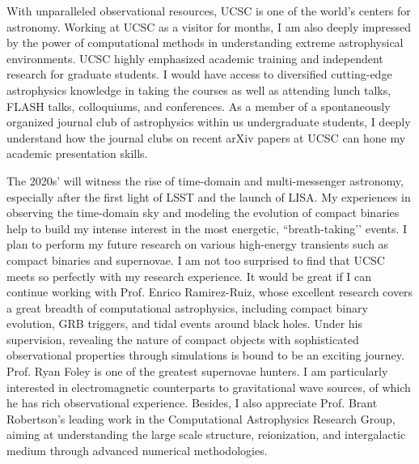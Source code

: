 \documentclass[11pt, a4paper]{awesome-cv} %
\begin{document}
\makecvheader %



\begin{cvletter}




With unparalleled observational resources, UCSC is one of the world’s centers for astronomy. Working at UCSC as a visitor for months, I am also deeply impressed by the power of computational methods in understanding extreme astrophysical environments. UCSC highly emphasized academic training and independent research for graduate students. I would have access to diversified cutting-edge astrophysics knowledge in taking the courses as well as attending lunch talks, FLASH talks, colloquiums, and conferences. As a member of a spontaneously organized journal club of astrophysics within us undergraduate students, I deeply understand how the journal clubs on recent arXiv papers at UCSC can hone my academic presentation skills.

The 2020s' will witness the rise of time-domain and multi-messenger astronomy, especially after the first light of LSST and the launch of LISA. My experiences in observing the time-domain sky and modeling the evolution of compact binaries help to build my intense interest in the most energetic, ``breath-taking'’ events. I plan to perform my future research on various high-energy transients such as compact binaries and supernovae. I am not too surprised to find that UCSC meets so perfectly with my research experience. It would be great if I can continue working with Prof. Enrico Ramirez-Ruiz, whose excellent research covers a great breadth of computational astrophysics, including compact binary evolution, GRB triggers, and tidal events around black holes. Under his supervision, revealing the nature of compact objects with sophisticated observational properties through simulations is bound to be an exciting journey. Prof. Ryan Foley is one of the greatest supernovae hunters. I am particularly interested in electromagnetic counterparts to gravitational wave sources, of which he has rich observational experience. Besides, I also appreciate Prof. Brant Robertson’s leading work in the Computational Astrophysics Research Group, aiming at understanding the large scale structure, reionization, and intergalactic medium through advanced numerical methodologies.


\end{cvletter}
\end{document}
